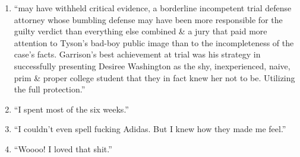 \documentclass{article}
\numberwithin{equation}{section}
\begin{document}
\begin{enumerate}
	\item ``may have withheld critical evidence, a borderline incompetent trial defense attorney whose bumbling defense may have been more responsible for the guilty verdict than everything else combined \& a jury that paid more attention to Tyson's bad-boy public image than to the incompleteness of the case's facts. Garrison's best achievement at trial was his strategy in successfully presenting Desiree Washington as the shy, inexperienced, naive, prim \& proper college student that they in fact knew her not to be. Utilizing the full protection.''
	\item ``I spent most of the six weeks.''
	\item ``I couldn't even spell fucking Adidas. But I knew how they made me feel.''
	\item ``Woooo! I loved that shit.''
\end{enumerate}


\printbibliography[heading=bibintoc]
	
\end{document}
